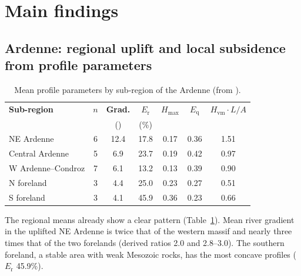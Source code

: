 \documentclass[10pt,a4paper,twocolumn]{article}
\newcommand{\permil}{\textperthousand}
\newcommand{\Hvm}{\ensuremath{H_\mathrm{vm}}}
\begin{document}
\section{Main findings}

\subsection{Ardenne: regional uplift and local subsidence from profile parameters}

\begin{table}[t]
\centering
\caption{Mean profile parameters by sub-region of the Ardenne (from \citealp{Demoulin1998}).}
\label{tab:d98}
\scriptsize
\setlength{\tabcolsep}{3.2pt}
\begin{tabular}{@{}lcccccc@{}}
\toprule
\textbf{Sub-region} & $n$ & \textbf{Grad.} & $E_\mathrm{r}$ & $H_\mathrm{max}$ & $E_\mathrm{q}$ & $\Hvm\!\cdot\!L/A$\\
& & (\permil) & (\%) & & & \\
\midrule
NE Ardenne & 6 & 12.4 & 17.8 & 0.17 & 0.36 & 1.51\\
Central Ardenne & 5 & 6.9 & 23.7 & 0.19 & 0.42 & 0.97\\
W Ardenne--Condroz & 7 & 6.1 & 13.2 & 0.13 & 0.39 & 0.90\\
N foreland & 3 & 4.4 & 25.0 & 0.23 & 0.27 & 0.51\\
S foreland & 3 & 4.1 & 45.9 & 0.36 & 0.23 & 0.66\\
\bottomrule
\end{tabular}
\end{table}

The regional means already show a clear pattern (Table~\ref{tab:d98}). Mean river gradient in the
uplifted NE Ardenne is twice that of the western massif and nearly three times that of the two
forelands (derived ratios 2.0 and 2.8--3.0). The southern foreland, a stable area with weak Mesozoic
rocks, has the most concave profiles ($E_\mathrm{r}$ 45.9\%).
\end{document}
